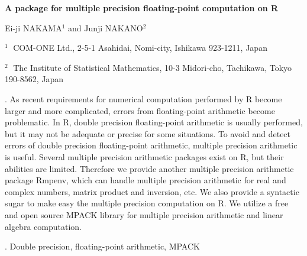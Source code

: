 \documentclass[12pt]{article}
\begin{document}
\begin{flushleft}


{\LARGE\bf A package for multiple precision floating-point computation on R}


\vspace{1.0cm}

Ei-ji NAKAMA$^1$ and Junji NAKANO$^2$ 

\begin{description}

\item $^1 \;$ COM-ONE Ltd.,
2-5-1 Asahidai, Nomi-city, Ishikawa 923-1211, Japan

\item $^2 \;$ The Institute of Statistical Mathematics,
10-3 Midori-cho, Tachikawa, Tokyo 190-8562, Japan


\end{description}

\end{flushleft}


\vspace{0.75cm}

. 
As recent requirements for numerical computation performed by R become larger and more complicated, 
errors from floating-point arithmetic become problematic. In R, double precision floating-point arithmetic 
is usually performed, but it may not be adequate or precise for some situations. To avoid and detect errors 
of double precision floating-point arithmetic, multiple precision arithmetic is useful. 
Several multiple precision arithmetic packages exist on R, but their abilities are limited. 
Therefore we provide another multiple precision arithmetic package Rmpenv, which can handle multiple 
precision arithmetic for real and complex numbers, matrix product and inversion, etc. 
We also provide a syntactic sugar to make easy the multiple precision computation on R. 
We utilize a free and open source MPACK library for multiple precision arithmetic and linear algebra computation.
\vskip 2mm

.
Double precision, floating-point arithmetic, MPACK 
\end{document}

